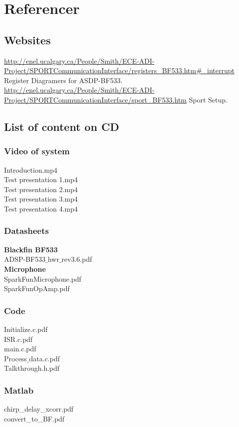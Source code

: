 \chapter{Referencer}
\section{Websites}
\url{http://enel.ucalgary.ca/People/Smith/ECE-ADI-Project/SPORTCommunicationInterface/registers_BF533.htm#_interrupt}
Register Diagramers for ASDP-BF533.\\
\url{http://enel.ucalgary.ca/People/Smith/ECE-ADI-Project/SPORTCommunicationInterface/sport_BF533.htm}
Sport Setup.\\

\section{List of content on CD}
\subsection{Video of system}
Introduction.mp4\\
Test presentation 1.mp4\\
Test presentation 2.mp4\\
Test presentation 3.mp4\\
Test presentation 4.mp4\\


\subsection{Datasheets} 
\textbf{Blackfin BF533}\\
ADSP-BF533$\_$hwr$\_$rev3.6.pdf\\
\textbf{Microphone}\\
SparkFunMicrophone.pdf\\
SparkFunOpAmp.pdf\\


\subsection{Code}
Initialize.c.pdf\\
ISR.c.pdf\\
main.c.pdf\\
Process$\_$data.c.pdf\\
Talkthrough.h.pdf\\

\subsection{Matlab}
chirp_delay_xcorr.pdf\\
convert_to_BF.pdf\\